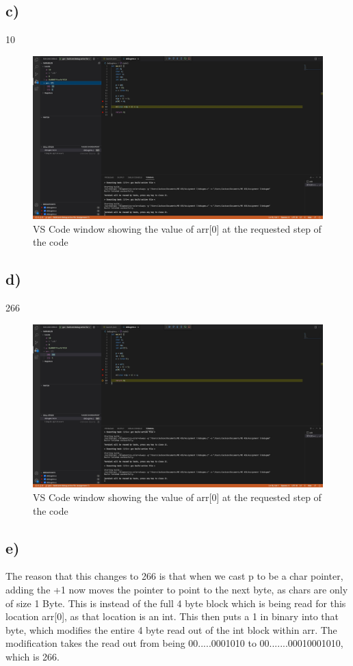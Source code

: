 \documentclass[11pt, oneside]{article}   	%
\begin{document}
\subsection*{c)}
10
		\begin{figure} [h]
			\centering
			\includegraphics[width=125 mm]{Task1C.jpg}
			\caption{VS Code window showing the value of arr[0] at the requested step of the code}
		\end{figure}
	\newpage	
\subsection*{d)}
266

		\begin{figure} [h]
			\centering
			\includegraphics[width=125 mm]{Task1D.jpg}
			\caption{VS Code window showing the value of arr[0] at the requested step of the code}
		\end{figure}
		\newpage	
\subsection*{e)}

The reason that this changes to 266 is that when we cast p to be a char pointer, adding the +1 now moves the pointer to point to the next byte, as chars are only of size 1 Byte.  This is instead of the full 4 byte block which is being read for this location arr[0], as that location is an int.  This then puts a 1 in binary into that byte, which modifies the entire 4 byte read out of the int block within arr.  The modification takes the read out from being 00.....0001010 to 00.......00010001010, which is 266.

		
\end{document}
